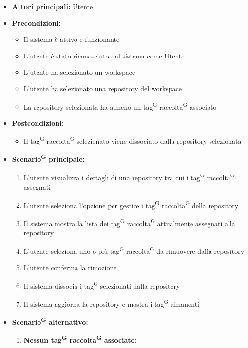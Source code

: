 \documentclass[a4paper, 11pt]{article}
\begin{document}
\begin{itemize}
	\item \textbf{Attori principali:} Utente
	\item \textbf{Precondizioni:}
	\begin{itemize}
		\item Il sistema è attivo e funzionante
		\item L'utente è stato riconosciuto dal sistema come Utente
		\item L'utente ha selezionato un workspace
		\item L'utente ha selezionato una repository del workspace
		\item La repository selezionata ha almeno un tag\textsuperscript{G} raccolta\textsuperscript{G} associato
	\end{itemize}
	\item \textbf{Postcondizioni:}
	\begin{itemize}
		\item Il tag\textsuperscript{G} raccolta\textsuperscript{G} selezionato viene dissociato dalla repository selezionata
	\end{itemize}
	\item \textbf{Scenario\textsuperscript{G} principale:}
	\begin{enumerate}
		\item L'utente visualizza i dettagli di una repository tra cui i tag\textsuperscript{G} raccolta\textsuperscript{G} assegnati
		\item L'utente seleziona l'opzione per gestire i tag\textsuperscript{G} raccolta\textsuperscript{G} della repository
		\item Il sistema mostra la lista dei tag\textsuperscript{G} raccolta\textsuperscript{G} attualmente assegnati alla repository
		\item L'utente seleziona uno o più tag\textsuperscript{G} raccolta\textsuperscript{G} da rimuovere dalla repository
		\item L'utente conferma la rimozione
		\item Il sistema dissocia i tag\textsuperscript{G} selezionati dalla repository
		\item Il sistema aggiorna la repository e mostra i tag\textsuperscript{G} rimanenti
	\end{enumerate}
		\item \textbf{Scenario\textsuperscript{G} alternativo:}
	\begin{enumerate}
		\item \textbf{Nessun tag\textsuperscript{G} raccolta\textsuperscript{G} associato:}

\end{enumerate}
\end{itemize}
\end{document}

